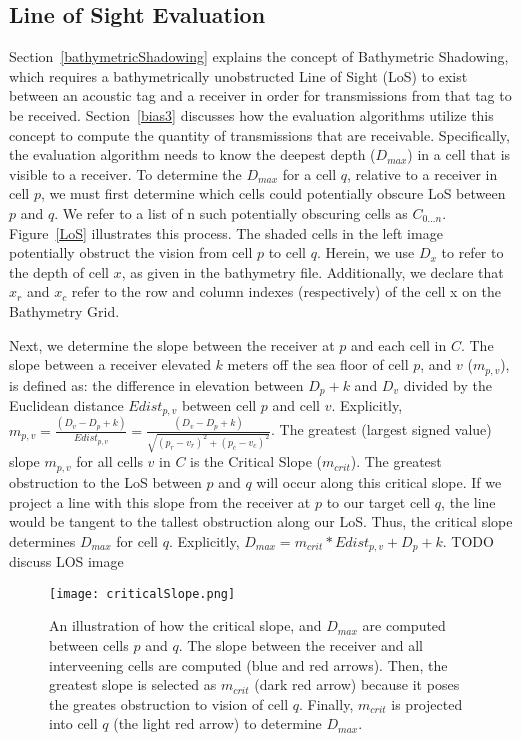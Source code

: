 \subsection {Line of Sight Evaluation}
\label{LoSAlgorithm}
Section~\ref{bathymetricShadowing} explains the concept of Bathymetric Shadowing, which requires a bathymetrically unobstructed Line of Sight (LoS) to exist between an acoustic tag and a receiver in order for transmissions from that tag to be received.  Section~\ref{bias3} discusses how the evaluation algorithms utilize this concept to compute the quantity of transmissions that are receivable.  Specifically, the evaluation algorithm needs to know the deepest depth ($D_{max}$) in a cell that is visible to a receiver.  To determine the $D_{max}$ for a cell $q$, relative to a receiver in cell $p$, we must first determine which cells could potentially obscure LoS between $p$ and $q$.  We refer to a list of n such potentially obscuring cells as $C_{0...n}$.   Figure~\ref{LoS} illustrates this process.  The shaded cells in the left image potentially obstruct the vision from cell $p$ to cell $q$.  Herein, we use $D_x$ to refer to the depth of cell $x$, as given in the bathymetry file.  Additionally, we declare that $x_r$ and $x_c$ refer to the row and column indexes (respectively) of the cell x on the Bathymetry Grid.

Next, we determine the slope between the receiver at $p$ and each cell in $C$.  The slope between a receiver elevated $k$ meters off the sea floor of cell $p$, and $v$  ($m_{p,v}$), is defined as: the difference in elevation between $D_p + k$ and $D_v$ divided by the Euclidean distance $Edist_{p,v}$ between cell $p$ and cell $v$.  Explicitly, $m_{p,v} = \frac{(D_v - D_p + k)}{Edist_{p,v}} = \frac{(D_v - D_p + k)}{\sqrt{(p_r - v_r )^2 + (p_c - v_c)^2}}$.  The greatest (largest signed value) slope $m_{p,v}$ for all cells $v$ in $C$ is the Critical Slope ($m_{crit}$).  The greatest obstruction to the LoS between $p$ and $q$ will occur along this critical slope.  If we project a line with this slope from the receiver at $p$ to our target cell $q$, the line would be tangent to the tallest obstruction along our LoS.  Thus, the critical slope determines $D_{max}$ for cell $q$.  Explicitly, $D_{max} = m_{crit} * Edist_{p,v} + D_p + k$.
TODO discuss LOS image
\begin{figure}[ht]
	\centering
	\texttt{[image: criticalSlope.png]}
	\caption{An illustration of how the critical slope, and $D_{max}$ are computed between cells $p$ and $q$.  The slope between the receiver and all interveening cells are computed (blue and red arrows).  Then, the greatest slope is selected as $m_{crit}$ (dark red arrow) because it poses the greates obstruction to vision of cell $q$.  Finally, $m_{crit}$ is projected into cell $q$ (the light red arrow) to determine $D_{max}$.
		\label{observableAnimals}}
\end{figure}
